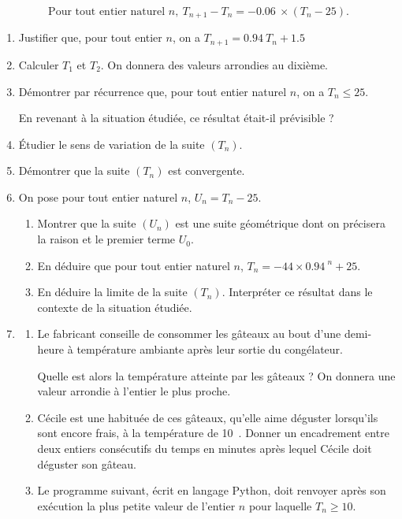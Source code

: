 \documentclass[10pt]{article}
\providecommand{\np}[2][]{{#2~#1}}
\begin{document}
\[\text{Pour tout entier naturel } n,\ T_{n+1}-T_n=-\np{0.06}\times \left(T_n - 25\right).\]
\begin{enumerate}
\item Justifier que, pour tout entier $n$, on a $T_{n+1}=\np{0.94}T_n + \np{1.5}$
\item Calculer $T_1$ et $T_2$. On donnera des valeurs arrondies au dixième.
\item Démontrer par récurrence que, pour tout entier naturel $n$, on a $T_n\leqslant 25$.

En revenant à la situation étudiée, ce résultat était-il prévisible ?
\item Étudier le sens de  variation de la suite $\left(T_n\right)$.
\item Démontrer que la suite $\left(T_n\right)$ est convergente.
\item On pose pour tout entier naturel $n$, $U_n = T_n - 25$.
\begin{enumerate}
\item Montrer que la suite $\left(U_n\right)$ est une suite géométrique dont on précisera la raison et le premier terme $U_0$.
\item En déduire que pour tout entier naturel $n$, $T_n=-44\times \np{0.94}^n+25$.
\item En déduire la limite de la suite $\left(T_n\right)$. Interpréter ce résultat dans le contexte de la situation étudiée.
\end{enumerate}
\item 
	\begin{enumerate}
		\item Le fabricant conseille de consommer les gâteaux au bout d'une demi-heure à température ambiante après leur sortie du congélateur.
		 
Quelle est alors la température atteinte par les gâteaux ? On donnera une valeur arrondie à l'entier le plus proche.
		\item Cécile est une habituée de ces gâteaux, qu'elle aime déguster lorsqu'ils sont encore frais, à la température de 10~\textcelsius.
Donner un encadrement entre deux entiers consécutifs du temps en minutes après lequel Cécile doit déguster son gâteau.

\item Le programme suivant, écrit en langage Python, doit renvoyer après son exécution
la plus petite valeur de l'entier $n$ pour laquelle $T_n \geqslant 10$.

\vspace{0.5cm}


\end{enumerate}
\end{enumerate}
\end{document}
